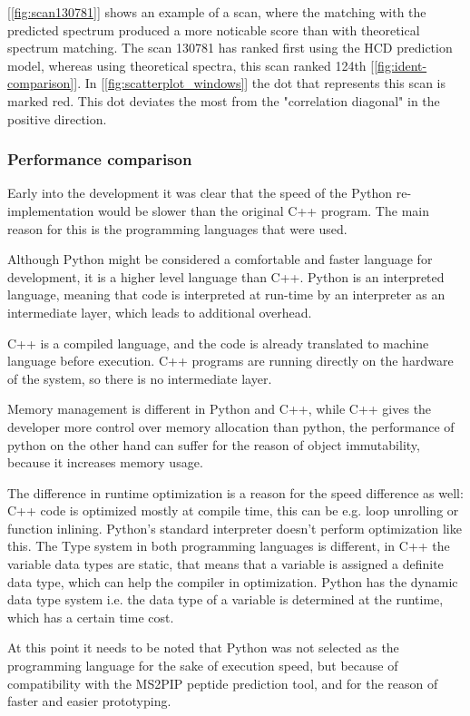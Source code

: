 \documentclass[11pt]{article}
\begin{document}
[\cref{fig:scan130781}] shows an example of a scan, where the matching with the predicted spectrum produced a more noticable score than with theoretical spectrum matching. The scan 130781 has ranked first using the HCD prediction model, whereas using theoretical spectra, this scan ranked 124th [\cref{fig:ident-comparison}]. In [\cref{fig:scatterplot_windows}] the dot that represents this scan is marked red. This dot deviates the most from the "correlation diagonal" in the positive direction.

\subsubsection{Performance comparison}
Early into the development it was clear that the speed of the Python re-implementation would be slower than the original C++ program. The main reason for this is the programming languages that were used. 

Although Python might be considered a comfortable and faster language for development, it is a higher level language than C++. Python is an interpreted language, meaning that code is interpreted at run-time by an interpreter as an intermediate layer, which leads to additional overhead.

C++ is a compiled language, and the code is already translated to machine language before execution. C++ programs are running directly on the hardware of the system, so there is no intermediate layer. 

Memory management is different in Python and C++, while C++ gives the developer more control over memory allocation than python, the performance of python on the other hand can suffer for the reason of object immutability, because it increases memory usage. 

The difference in runtime optimization is a reason for the speed difference as well: C++ code is optimized mostly at compile time, this can be e.g. loop unrolling or function inlining. Python's standard interpreter doesn't perform optimization like this. The Type system in both programming languages is different, in C++ the variable data types are static, that means that a variable is assigned a definite data type, which can help the compiler in optimization. Python has the dynamic data type system i.e. the data type of a variable is determined at the runtime, which has a certain time cost.

At this point it needs to be noted that Python was not selected as the programming language for the sake of execution speed, but because of compatibility with the MS2PIP peptide prediction tool, and for the reason of faster and easier prototyping.
\end{document}

